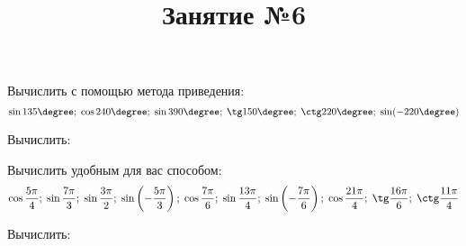 \begin{listofex}
	\item Вычислить с помощью метода приведения:
	\[ \sin135\degree;\;\cos240\degree;\;\sin390\degree;\;\tg150\degree;\;\ctg220\degree;\;\sin(-220\degree) \]
	\item Вычислить:
	\begin{enumcols}[itemcolumns=3]
		\item {}
		\item {}
		\item {}
		\item {}
		\item {}
	\end{enumcols}
	\item Вычислить удобным для вас способом:
	\[ \cos\dfrac{5\pi}{4};\;\sin\dfrac{7\pi}{3};\;\sin\dfrac{3\pi}{2};\;\sin\left( -\dfrac{5\pi}{3} \right);\;\cos\dfrac{7\pi}{6};\;\sin\dfrac{13\pi}{4};\;\sin\left( -\dfrac{7\pi}{6}  \right);\;\cos\dfrac{21\pi}{4};\;\tg\dfrac{16\pi}{6};\;\ctg\dfrac{11\pi}{4} \]
	\item Вычислить:
	\begin{enumcols}[itemcolumns=2]
		\item {}
		\item {}
	\end{enumcols}
\end{listofex}
\newpage
\title{Занятие №6}
